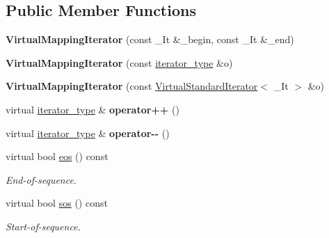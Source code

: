 \subsection*{Public Member Functions}
\begin{DoxyCompactItemize}
\item 
{\bfseries Virtual\+Mapping\+Iterator} (const \+\_\+\+It \&\+\_\+begin, const \+\_\+\+It \&\+\_\+end)\hypertarget{classAudio_1_1VirtualMappingIterator_aae1a87269da710665dbb61ca23bfebc6}{}\label{classAudio_1_1VirtualMappingIterator_aae1a87269da710665dbb61ca23bfebc6}

\item 
{\bfseries Virtual\+Mapping\+Iterator} (const \hyperlink{classAudio_1_1VirtualIterator}{iterator\+\_\+type} \&o)\hypertarget{classAudio_1_1VirtualMappingIterator_a54ded4422e9ea5e0d76f527c64dafcf2}{}\label{classAudio_1_1VirtualMappingIterator_a54ded4422e9ea5e0d76f527c64dafcf2}

\item 
{\bfseries Virtual\+Mapping\+Iterator} (const \hyperlink{classAudio_1_1VirtualStandardIterator}{Virtual\+Standard\+Iterator}$<$ \+\_\+\+It $>$ \&o)\hypertarget{classAudio_1_1VirtualMappingIterator_a8a3e3df3019e6b84036ff967c023d41c}{}\label{classAudio_1_1VirtualMappingIterator_a8a3e3df3019e6b84036ff967c023d41c}

\item 
virtual \hyperlink{classAudio_1_1VirtualIterator}{iterator\+\_\+type} \& {\bfseries operator++} ()\hypertarget{classAudio_1_1VirtualMappingIterator_a0a29284dd92de48ac82aed378d70a190}{}\label{classAudio_1_1VirtualMappingIterator_a0a29284dd92de48ac82aed378d70a190}

\item 
virtual \hyperlink{classAudio_1_1VirtualIterator}{iterator\+\_\+type} \& {\bfseries operator-\/-\/} ()\hypertarget{classAudio_1_1VirtualMappingIterator_a8ba09ad195c749c6e6da5745f3a7e938}{}\label{classAudio_1_1VirtualMappingIterator_a8ba09ad195c749c6e6da5745f3a7e938}

\item 
virtual bool \hyperlink{classAudio_1_1VirtualMappingIterator_a68443c5269b4c01d54a71e47f39b1428}{eos} () const \hypertarget{classAudio_1_1VirtualMappingIterator_a68443c5269b4c01d54a71e47f39b1428}{}\label{classAudio_1_1VirtualMappingIterator_a68443c5269b4c01d54a71e47f39b1428}

\begin{DoxyCompactList}\small\item\em End-\/of-\/sequence. \end{DoxyCompactList}\item 
virtual bool \hyperlink{classAudio_1_1VirtualMappingIterator_a7758d7f55e229002c62c40ac4b90a082}{sos} () const \hypertarget{classAudio_1_1VirtualMappingIterator_a7758d7f55e229002c62c40ac4b90a082}{}\label{classAudio_1_1VirtualMappingIterator_a7758d7f55e229002c62c40ac4b90a082}

\begin{DoxyCompactList}\small\item\em Start-\/of-\/sequence. \end{DoxyCompactList}\end{DoxyCompactItemize}
